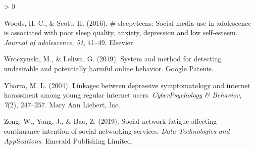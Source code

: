 \documentclass[
  10pt,
  dvipsnames]{scrartcl}
\newlength{\cslhangindent}
\newenvironment{CSLReferences}[2] %
 {%
  \setlength{\parindent}{0pt}
  \ifodd #1 \everypar{\setlength{\hangindent}{\cslhangindent}}\ignorespaces\fi
  \ifnum #2 > 0
  \setlength{\parskip}{#2\baselineskip}
  \fi
 }%
 {}
\begin{document}
\begin{CSLReferences}{1}{0}
\leavevmode\hypertarget{ref-woods2016sleepyteens}{}%
Woods, H. C., \& Scott, H. (2016). \# sleepyteens: Social media use in
adolescence is associated with poor sleep quality, anxiety, depression
and low self-esteem. \emph{Journal of adolescence}, \emph{51}, 41--49.
Elsevier.

\leavevmode\hypertarget{ref-wroczynski2019system}{}%
Wroczynski, M., \& Leliwa, G. (2019). System and method for detecting
undesirable and potentially harmful online behavior. Google Patents.

\leavevmode\hypertarget{ref-ybarra2004linkages}{}%
Ybarra, M. L. (2004). Linkages between depressive symptomatology and
internet harassment among young regular internet users.
\emph{CyberPsychology \& Behavior}, \emph{7}(2), 247--257. Mary Ann
Liebert, Inc.

\leavevmode\hypertarget{ref-zong2019social}{}%
Zong, W., Yang, J., \& Bao, Z. (2019). Social network fatigue affecting
continuance intention of social networking services. \emph{Data
Technologies and Applications}. Emerald Publishing Limited.

\end{CSLReferences}
\end{document}
